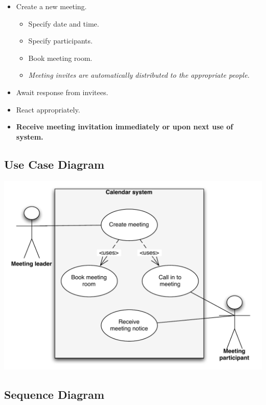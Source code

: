 \documentclass{article}
\begin{document}
\begin{itemize}
\item Create a new meeting.

\begin{itemize}
\item Specify date and time.

\item Specify participants.

\item Book meeting room.

\item \textit{Meeting invites are automatically distributed to the
appropriate people.}
\end{itemize}

\item Await response from invitees.

\item React appropriately.

\item \textbf{Receive meeting invitation immediately or upon next use of
system.}
\end{itemize}

\subsection{Use Case Diagram}

\includegraphics[scale=0.9]{UseCase/usecase2FP.pdf}

\subsection{Sequence Diagram}
\end{document}
